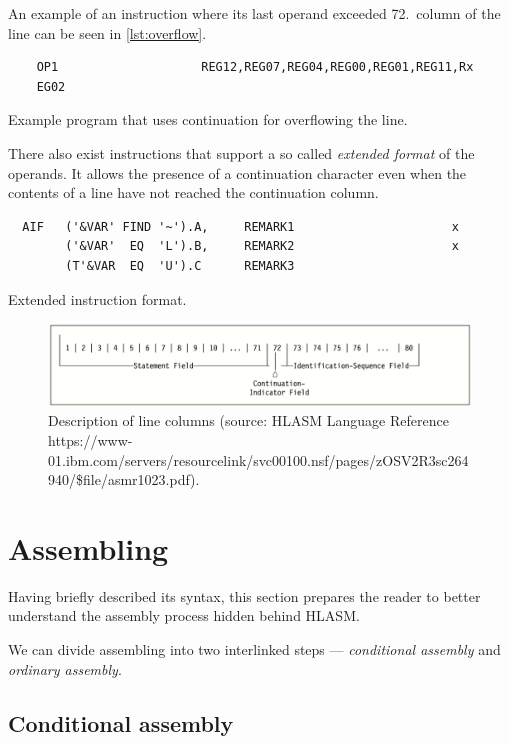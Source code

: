 An example of an instruction where its last operand exceeded 72.~column of the line can be seen in \cref{lst:overflow}.
\begin{listing}
	\begin{verbatim}
	OP1                    REG12,REG07,REG04,REG00,REG01,REG11,Rx
	EG02
	\end{verbatim}
	\caption{Example program that uses continuation for overflowing the line.}
	\label{lst:overflow}
\end{listing}

There also exist instructions that support a so called \textit{extended format} of the operands. It allows the presence of a continuation character even when the contents of a line have not reached the continuation column.

\begin{listing}
\begin{verbatim}
  AIF   ('&VAR' FIND '~').A,     REMARK1                      x
        ('&VAR'  EQ  'L').B,     REMARK2                      x
        (T'&VAR  EQ  'U').C      REMARK3 
\end{verbatim}
\caption{Extended instruction format.}
\label{lst:extended}
\end{listing}

\begin{figure}
	\includegraphics[width=\textwidth]{img/line}
	\caption{Description of line columns (source: HLASM Language Reference https://www-01.ibm.com/servers/resourcelink/\-svc00100.nsf/\-pages/\-zOSV2R3sc264940/\-\$file/\-asmr1023.pdf).}
	\label{fig01:line}
\end{figure}


\section{Assembling}

Having briefly described its syntax, this section prepares the reader to better understand the assembly process hidden behind HLASM. 

We can divide assembling into two interlinked steps --- \emph{conditional assembly} and \emph{ordinary assembly}.

\subsection{Conditional assembly}

